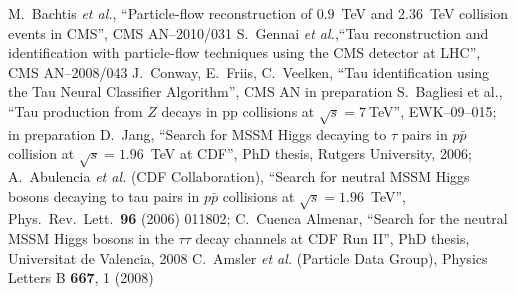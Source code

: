 \clearpage
\begin{thebibliography}{9}

  M.~Bachtis {\it et al.}, ``Particle-flow reconstruction of $0.9$~TeV and $2.36$~TeV collision events in CMS'',
  CMS AN--2010/031
  S.~Gennai {\it et al.},``Tau reconstruction and identification with particle-flow techniques using the CMS detector at LHC'', 
  CMS AN--2008/043
  J.~Conway, E.~Friis, C.~Veelken, ``Tau identification using the Tau Neural Classifier Algorithm'',
  CMS AN in preparation
  S.~Bagliesi et al., ``Tau production from $Z$ decays in ${\mathrm{pp}}$ collisions at $\sqrt{s} = 7~$TeV'',
  EWK--09--015; in preparation
  D.~Jang, ``Search for MSSM Higgs decaying to $\tau$ pairs in $p\bar{p}$ collision at $\sqrt{s} = 1.96$~TeV at CDF'',
  PhD thesis, Rutgers University, 2006; 
  A.~Abulencia {\it et al.} (CDF Collaboration), 
  ``Search for neutral MSSM Higgs bosons decaying to tau pairs in $p\bar{p}$ collisions at $\sqrt{s} = 1.96$~TeV'',
  Phys.\ Rev.\ Lett.\ {\bf 96} (2006) 011802;
  C.~Cuenca Almenar, ``Search for the neutral MSSM Higgs bosons in the $\tau\tau$ decay channels at CDF Run II'',
  PhD thesis, Universitat de Valencia, 2008
  C.~Amsler {\it et al.} (Particle Data Group), Physics Letters B {\bf 667}, 1 (2008)

\end{thebibliography}


